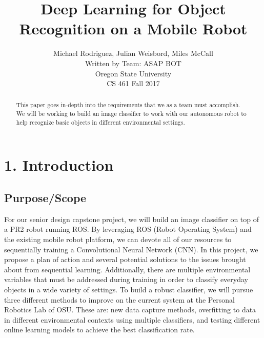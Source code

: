 \documentclass[draftclsnofoot, onecolumn, 10pt, compsoc]{IEEEtran}
\title{Deep Learning for Object Recognition on a Mobile Robot}
\author{Michael Rodriguez, Julian Weisbord, Miles McCall\\Written by Team: ASAP BOT\\Oregon State University\\CS 461 Fall 2017}
\begin{document}
\maketitle

\begin{abstract}
This paper goes in-depth into the requirements that we as a team must accomplish. We will be working to build an image classifier to work with our autonomous robot to help recognize basic objects in different environmental settings. 
\end{abstract}
\newpage

\section{1. Introduction}
\subsection{Purpose/Scope}
For our senior design capstone project, we will build an image classifier on top of a PR2 robot running ROS. By leveraging ROS (Robot Operating System)  and the existing mobile robot platform, we can devote all of our resources to sequentially training a Convolutional Neural Network (CNN). In this project, we propose a plan of action and several potential solutions to the issues brought about from sequential learning. Additionally, there are multiple environmental variables that must be addressed during training in order to classify everyday objects in a wide variety of settings. To build a robust classifier, we will pursue three different methods to improve on the current system at the Personal Robotics Lab of OSU. These are: new data capture methods, overfitting to data in different environmental contexts using multiple classifiers, and testing different online learning models to achieve the best classification rate. 
\end{document}
